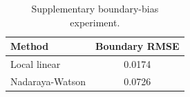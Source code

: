 \begin{table}[H]
\centering
\caption{Supplementary boundary-bias experiment.}
\label{tab:boundary-experiment}
\small
\begin{tabular}{lc}
\toprule
Method & Boundary RMSE \\
\midrule
Local linear & 0.0174 \\
Nadaraya-Watson & 0.0726 \\
\bottomrule
\end{tabular}
\end{table}
